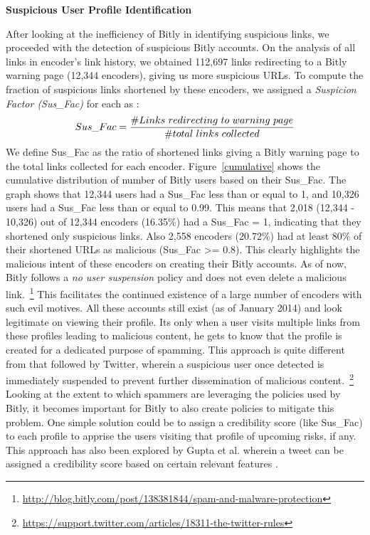 \documentclass[conference]{IEEEtran}
\begin{document}
\vspace{4pt}
\textbf{Suspicious User Profile Identification}


After looking at the inefficiency of Bitly in identifying suspicious links, we proceeded with the detection of suspicious Bitly accounts. On the analysis of all links in encoder's link history, we obtained 112,697 links redirecting to a Bitly warning page (12,344 encoders), giving us more suspicious URLs. To compute the fraction of suspicious links shortened by these encoders, we assigned a \textit{Suspicion Factor (Sus\_Fac)} for each as :
\begin{equation}\label{eq:suspicionFactor}
\small
Sus\_Fac=\frac{\#Links~redirecting~to~warning~page}{\#total~links~collected}
\end{equation}  
We define Sus\_Fac as the ratio of shortened links giving a Bitly warning page to the total links collected for each encoder. Figure~\ref{cumulative} shows the cumulative distribution of number of Bitly users based on their Sus\_Fac. The graph shows that 12,344 users had a Sus\_Fac less than or equal to 1, and 10,326 users had a Sus\_Fac less than or equal to 0.99. This means that 2,018 (12,344 - 10,326) out of 12,344 encoders (16.35\%) had a Sus\_Fac = 1, indicating that they shortened only suspicious links. Also 2,558 encoders (20.72\%) had at least 80\% of their shortened URLs as malicious (Sus\_Fac \textgreater= 0.8). This clearly highlights the malicious intent of these encoders on creating their Bitly accounts. As of now, Bitly follows a \textit{no user suspension} policy and does not even delete a malicious link.~\footnote{\url{http://blog.bitly.com/post/138381844/spam-and-malware-protection}} This facilitates the continued existence of a large number of encoders with such evil motives. All these accounts still exist (as of January 2014) and look legitimate on viewing their profile. Its only when a user visits multiple links from these profiles leading to malicious content, he gets to know that the profile is created for a dedicated purpose of spamming. This approach is quite different from that followed by Twitter, wherein a suspicious user once detected is immediately suspended to prevent further dissemination of malicious content.~\footnote{\url{https://support.twitter.com/articles/18311-the-twitter-rules}} Looking at the extent to which spammers are leveraging the policies used by Bitly, it becomes important for Bitly to also create policies to mitigate this problem. One simple solution could be to assign a credibility score (like Sus\_Fac) to each profile to apprise the users visiting that profile of upcoming risks, if any. This approach has also been explored by Gupta et al. wherein a tweet can be assigned a credibility score based on certain relevant features \cite{22}.  
\end{document}
